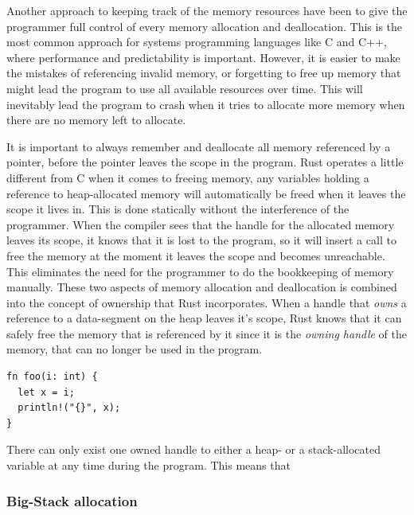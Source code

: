 Another approach to keeping track of the memory resources have been to give the programmer full
control of every memory allocation and deallocation. This is the most common approach for systems
programming languages like C and C++, where performance and predictability is important. However, it
is easier to make the mistakes of referencing invalid memory, or forgetting to free up memory that
might lead the program to use all available resources over time. This will inevitably lead the
program to crash when it tries to allocate more memory when there are no memory left to allocate.


It is important to always remember and deallocate all memory referenced by a pointer, before the
pointer leaves the scope in the program. Rust operates a little different from C when it comes to
freeing memory, any variables holding a reference to heap-allocated memory will automatically be
freed when it leaves the scope it lives in. This is done statically without the interference of the
programmer. When the compiler sees that the handle for the allocated memory leaves its scope, it
knows that it is lost to the program, so it will insert a call to free the memory at the moment it
leaves the scope and becomes unreachable. This eliminates the need for the programmer to do the
bookkeeping of memory manually. These two aspects of memory allocation and deallocation is combined
into the concept of ownership that Rust incorporates. When a handle that \textit{owns} a reference
to a data-segment on the heap leaves it's scope, Rust knows that it can safely free the memory that
is referenced by it since it is the \textit{owning handle} of the memory, that can no longer be
used in the program.

\begin{verbatim}
fn foo(i: int) {
  let x = i;
  println!("{}", x);
}
\end{verbatim}


There can only exist one owned handle to either a heap- or a stack-allocated variable at any time
during the program. This means that


\subsubsection{Big-Stack allocation}
\label{par:big_stack}

